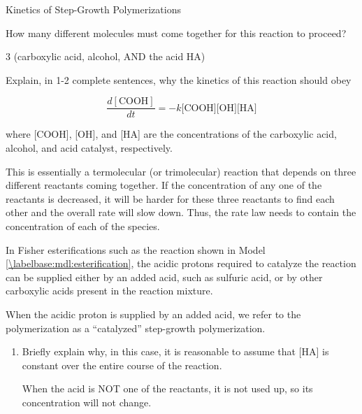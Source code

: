 \begin{activity}{Kinetics of Step-Growth Polymerizations}
\begin{ctqs}
		\question How many different molecules must come together for this reaction to proceed?
		
			\begin{solution}[0.5in]
				3 (carboxylic acid, alcohol, AND the acid HA)
			\end{solution}
		
		\question Explain, in 1-2 complete sentences, why the kinetics of this reaction should obey
		
			\begin{equation*}
				\frac{d[\text{COOH}]}{dt} = - k \text{[COOH][OH][HA]}
			\end{equation*}
			
			where [COOH], [OH], and [HA] are the concentrations of the carboxylic acid, alcohol, and acid catalyst, respectively.\label{\labelbase:ctq:fisherratelaw}
			
				\begin{solution}[1.5in]
					This is essentially a termolecular (or trimolecular) reaction that depends on three different reactants coming together.  If the concentration of any one of the reactants is decreased, it will be harder for these three reactants to find each other and the overall rate will slow down.  Thus, the rate law needs to contain the concentration of each of the species.
				\end{solution}
		
\end{ctqs}

\begin{infobox}
	In Fisher esterifications such as the reaction shown in Model \ref{\labelbase:mdl:esterification}, the acidic protons required to catalyze the reaction can be supplied either by an added acid, such as sulfuric acid, or by other carboxylic acids present in the reaction mixture.
\end{infobox}

\begin{ctqs}
	
	\question When the acidic proton is supplied by an added acid, we refer to the polymerization as a ``catalyzed'' step-growth polymerization.
	
		\begin{enumerate}
			\item Briefly explain why, in this case, it is reasonable to assume that [HA] is constant over the entire course of the reaction.
			
				\begin{solution}[0.5in]
					When the acid is NOT one of the reactants, it is not used up, so its concentration will not change.
				\end{solution}
			

\end{enumerate}
\end{ctqs}
\end{activity}
